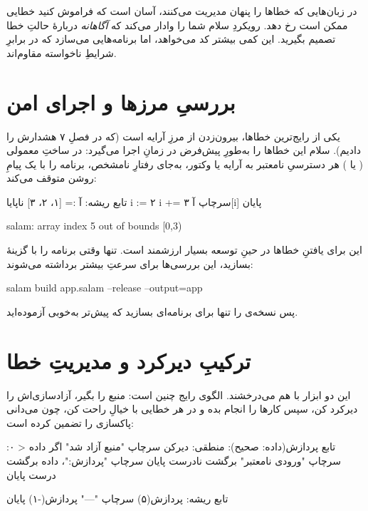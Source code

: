 \begin{warn}
در زبان‌هایی که خطاها را پنهان مدیریت می‌کنند، آسان است که فراموش کنید خطایی
ممکن است رخ دهد. رویکردِ سلام شما را وادار می‌کند که \emph{آگاهانه} دربارهٔ
حالتِ خطا تصمیم بگیرید. این کمی بیشتر کد می‌خواهد، اما برنامه‌هایی می‌سازد که در
برابرِ شرایطِ ناخواسته مقاوم‌اند.
\end{warn}

\section{بررسیِ مرزها و اجرای امن}

یکی از رایج‌ترین خطاها، بیرون‌زدن از مرزِ آرایه است (که در فصلِ ۷ هشدارش را
دادیم). سلام این خطاها را به‌طورِ پیش‌فرض در زمانِ اجرا می‌گیرد: در ساختِ
معمولی ( یا ) هر دسترسیِ نامعتبر به آرایه یا
وکتور، به‌جای رفتارِ نامشخص، برنامه را با یک پیامِ روشن متوقف می‌کند:

\begin{salamfa}
تابع ریشه:
    آ := [۱، ۲، ۳]
    ناپایا i := ۲
    i += ۳
    سرچاپ آ[i]
پایان
\end{salamfa}

\begin{shell}
salam: array index 5 out of bounds [0,3)
\end{shell}

این برای یافتنِ خطاها در حینِ توسعه بسیار ارزشمند است. تنها وقتی برنامه را با
گزینهٔ  بسازید، این بررسی‌ها برای سرعتِ بیشتر برداشته می‌شوند:

\begin{shell}
salam build app.salam --release --output=app
\end{shell}

پس نسخه‌ی  را تنها برای برنامه‌ای بسازید که پیش‌تر به‌خوبی
آزموده‌اید.

\section{ترکیبِ دیرکرد و مدیریتِ خطا}

این دو ابزار با هم می‌درخشند. الگوی رایج چنین است: منبع را بگیر، آزادسازی‌اش را
دیرکرد کن، سپس کارها را انجام بده و در هر خطایی با خیالِ راحت  کن،
چون می‌دانی  پاکسازی را تضمین کرده است:

\begin{salamfa}
تابع پردازش(داده: صحیح): منطقی:
    دیرکن سرچاپ "منبع آزاد شد"
    اگر داده < ۰:
        سرچاپ "ورودی نامعتبر"
        برگشت نادرست
    پایان
    سرچاپ "پردازش:"، داده
    برگشت درست
پایان

تابع ریشه:
    پردازش(۵)
    سرچاپ "---"
    پردازش(-۱)
پایان
\end{salamfa}

